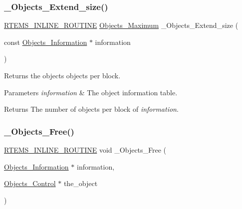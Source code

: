 \subsubsection{\texorpdfstring{\_Objects\_Extend\_size()}{\_Objects\_Extend\_size()}}
{\footnotesize\ttfamily \mbox{\hyperlink{group__RTEMSScoreBaseDefs_gac216239df231d5dbd15e3520b0b9313f}{R\+T\+E\+M\+S\+\_\+\+I\+N\+L\+I\+N\+E\+\_\+\+R\+O\+U\+T\+I\+NE}} \mbox{\hyperlink{group__RTEMSScoreObject_gaa2735357885ec7d7157c32f3f835f9ae}{Objects\+\_\+\+Maximum}} \+\_\+\+Objects\+\_\+\+Extend\+\_\+size (\begin{DoxyParamCaption}\item[{const \mbox{\hyperlink{structObjects__Information}{Objects\+\_\+\+Information}} $\ast$}]{information }\end{DoxyParamCaption})}



Returns the object\textquotesingle{}s objects per block. 


\begin{DoxyParams}{Parameters}
{\em information} & The object information table.\\
\hline
\end{DoxyParams}
\begin{DoxyReturn}{Returns}
The number of objects per block of {\itshape information}. 
\end{DoxyReturn}
\mbox{\label{group__RTEMSScoreObject_ga2215dcf7e3251e6f629b6a3a96fff44e}} 
\subsubsection{\texorpdfstring{\_Objects\_Free()}{\_Objects\_Free()}}
{\footnotesize\ttfamily \mbox{\hyperlink{group__RTEMSScoreBaseDefs_gac216239df231d5dbd15e3520b0b9313f}{R\+T\+E\+M\+S\+\_\+\+I\+N\+L\+I\+N\+E\+\_\+\+R\+O\+U\+T\+I\+NE}} void \+\_\+\+Objects\+\_\+\+Free (\begin{DoxyParamCaption}\item[{\mbox{\hyperlink{structObjects__Information}{Objects\+\_\+\+Information}} $\ast$}]{information,  }\item[{\mbox{\hyperlink{structObjects__Control}{Objects\+\_\+\+Control}} $\ast$}]{the\+\_\+object }\end{DoxyParamCaption})}



